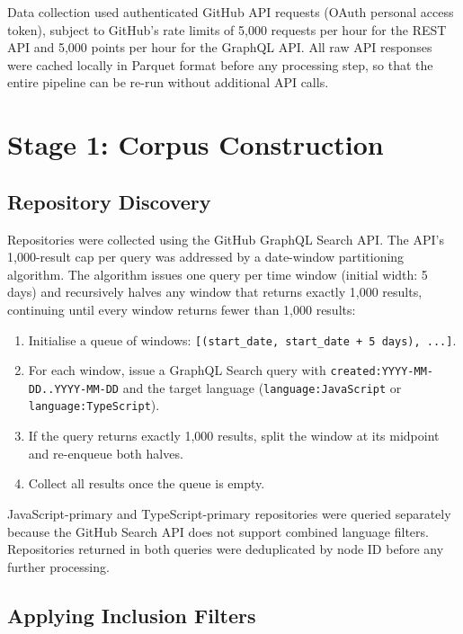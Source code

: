 Data collection used authenticated GitHub API requests (OAuth personal access token), subject to GitHub's rate limits of 5,000 requests per hour for the REST API and 5,000 points per hour for the GraphQL API. All raw API responses were cached locally in Parquet format before any processing step, so that the entire pipeline can be re-run without additional API calls.

\section{Stage 1: Corpus Construction}
\label{sec:impl:corpus}

\subsection{Repository Discovery}

Repositories were collected using the GitHub GraphQL Search API. The API's 1,000-result cap per query was addressed by a date-window partitioning algorithm. The algorithm issues one query per time window (initial width: 5 days) and recursively halves any window that returns exactly 1,000 results, continuing until every window returns fewer than 1,000 results:

\begin{enumerate}
  \item Initialise a queue of windows: \texttt{[(start\_date, start\_date + 5 days), ...]}.
  \item For each window, issue a GraphQL Search query with \texttt{created:YYYY-MM-DD..YYYY-MM-DD} and the target language (\texttt{language:JavaScript} or \texttt{language:TypeScript}).
  \item If the query returns exactly 1,000 results, split the window at its midpoint and re-enqueue both halves.
  \item Collect all results once the queue is empty.
\end{enumerate}

JavaScript-primary and TypeScript-primary repositories were queried separately because the GitHub Search API does not support combined language filters. Repositories returned in both queries were deduplicated by node ID before any further processing.

\subsection{Applying Inclusion Filters}

